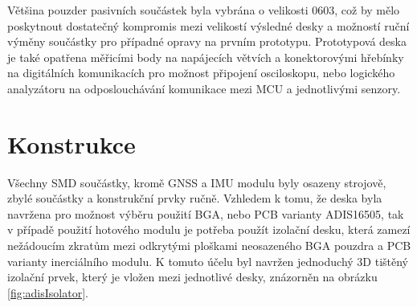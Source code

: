 Většina pouzder pasivních součástek byla vybrána o velikosti 0603, což by mělo poskytnout dostatečný kompromis mezi velikostí výsledné desky a možností ruční výměny součástky pro případné opravy na prvním prototypu. Prototypová deska je také opatřena měřicími body na napájecích větvích a konektorovými hřebínky na digitálních komunikacích pro možnost připojení osciloskopu, nebo logického analyzátoru na odposlouchávání komunikace mezi \ac{MCU} a jednotlivými senzory. 

\section{Konstrukce}

Všechny SMD součástky, kromě \ac{GNSS} a \ac{IMU} modulu byly osazeny strojově, zbylé součástky a konstrukční prvky ručně. Vzhledem k tomu, že deska byla navržena pro možnost výběru použití BGA, nebo PCB varianty ADIS16505, tak v případě použití hotového modulu je potřeba použít izolační desku, která zamezí nežádoucím zkratům mezi odkrytými ploškami neosazeného BGA pouzdra a PCB varianty inerciálního modulu. K tomuto účelu byl navržen jednoduchý 3D tištěný izolační prvek, který je vložen mezi jednotlivé desky, znázorněn na obrázku \ref{fig:adisIsolator}.

